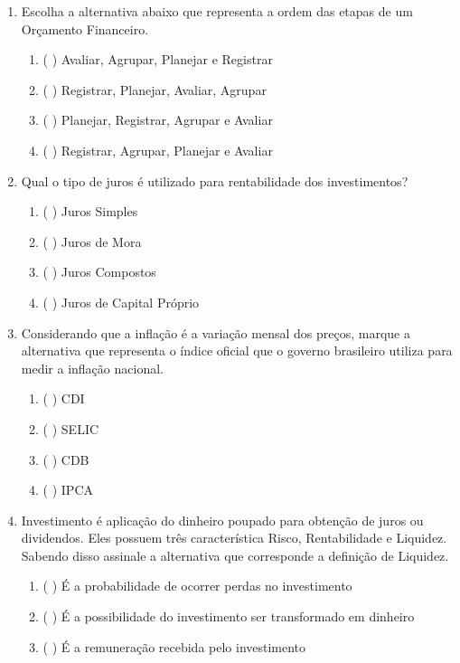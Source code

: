 \begin{enumerate}
    \item Escolha a alternativa abaixo que representa a ordem das etapas de um Orçamento Financeiro.
        \begin{enumerate}
            \item (   ) Avaliar, Agrupar, Planejar e Registrar
            \item (   ) Registrar, Planejar, Avaliar, Agrupar
            \item (   ) Planejar, Registrar, Agrupar e Avaliar
            \item (   ) Registrar, Agrupar, Planejar e Avaliar
        \end{enumerate}
    
    \newpage    
    \item Qual o tipo de juros é utilizado para rentabilidade dos investimentos?
        \begin{enumerate}
            \item (   ) Juros Simples
            \item (   ) Juros de Mora
            \item (   ) Juros Compostos
            \item (   ) Juros de Capital Próprio
        \end{enumerate}
        
    \item Considerando que a inflação é a variação mensal dos preços, marque a alternativa que representa o índice oficial que o governo brasileiro utiliza para medir a inflação nacional.
        \begin{enumerate}
            \item (   ) CDI
            \item (   ) SELIC
            \item (   ) CDB
            \item (   ) IPCA
        \end{enumerate}
        
    \item Investimento é aplicação do dinheiro poupado para obtenção de juros ou dividendos. Eles possuem três característica Risco, Rentabilidade e Liquidez. Sabendo disso assinale a alternativa que corresponde a definição de Liquidez.
        \begin{enumerate}
            \item (   ) É a probabilidade de ocorrer perdas no investimento
            \item (   ) É a possibilidade do investimento ser transformado em dinheiro
            \item (   ) É a remuneração recebida pelo investimento
        \end{enumerate}
        

\end{enumerate}
